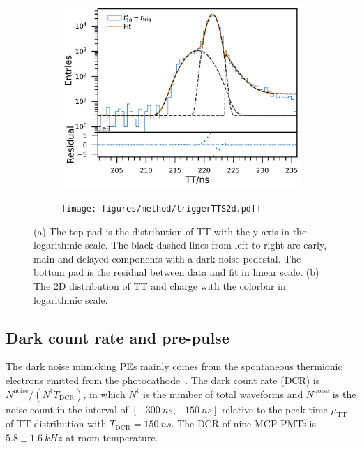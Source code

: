 \begin{figure}[!htbp]
    \centering
    \begin{subfigure}[t]{\SF\textwidth}
        \includegraphics[width=\textwidth]{figures/method/triggerTTSLog.pdf}
        \caption{}%
        \label{fig:triggerTTSLog}
    \end{subfigure}
    \begin{subfigure}[t]{\SF\textwidth}
        \texttt{[image: figures/method/triggerTTS2d.pdf]}
        \caption{}%
        \label{fig:triggerTTS2d}
    \end{subfigure}
    \caption{(a) The top pad is the distribution of TT with the y-axis in the logarithmic scale. The black dashed lines from left to right are early, main and delayed components with a dark noise pedestal. The bottom pad is the residual between data and fit in linear scale. (b) The 2D distribution of TT and charge with the colorbar in logarithmic scale.}
\end{figure}

\subsection{Dark count rate and pre-pulse}
\label{sec:dcr}
The dark noise mimicking PEs mainly comes from the spontaneous thermionic electrons emitted from the photocathode~\cite{KM3NetTesting}. The dark count rate (DCR) is ${N^{\mathrm{noise}}}/({N^{\mathrm{t}}T_{\mathrm{DCR}}})$, in which $N^{\mathrm{t}}$ is the number of total waveforms and $N^{\mathrm{noise}}$ is the noise count in the interval of $[\SI{-300}{ns},\SI{-150}{ns}]$ relative to the peak time $\mu_{\mathrm{TT}}$ of TT distribution with $T_{\mathrm{DCR}}=\SI{150}{ns}$. The DCR of nine MCP-PMTs is $5.8\pm\SI{1.6}{kHz}$ at room temperature.

